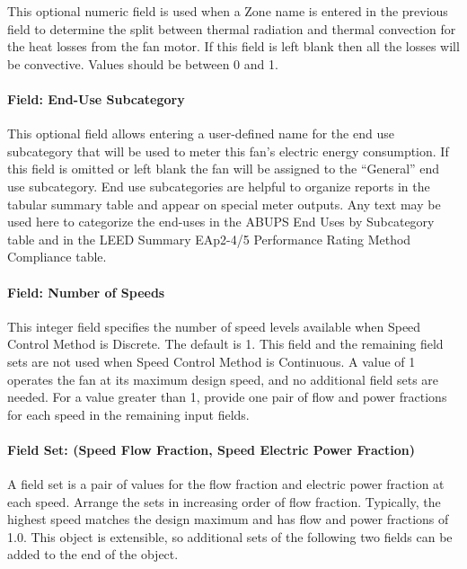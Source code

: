 This optional numeric field is used when a Zone name is entered in the previous field to determine the split between thermal radiation and thermal convection for the heat losses from the fan motor. If this field is left blank then all the losses will be convective.  Values should be between 0 and 1.

\paragraph{Field: End-Use Subcategory}\label{field-end-use-subcat-fansysmodel}

This optional field allows entering a user-defined name for the end use subcategory that will be used to meter this fan's electric energy consumption. If this field is omitted or left blank the fan will be assigned to the ``General'' end use subcategory.  End use subcategories are helpful to organize reports in the tabular summary table and appear on special meter outputs. Any text may be used here to categorize the end-uses in the ABUPS End Uses by Subcategory table and in the LEED Summary EAp2-4/5 Performance Rating Method Compliance table.

\paragraph{Field: Number of Speeds}\label{field-num-speeds-fansysmodel}

This integer field specifies the number of speed levels available when Speed Control Method is Discrete. The default is 1. This field and the remaining field sets are not used when Speed Control Method is Continuous. A value of 1 operates the fan at its maximum design speed, and no additional field sets are needed. For a value greater than 1, provide one pair of flow and power fractions for each speed in the remaining input fields.

\paragraph{Field Set: (Speed Flow Fraction, Speed Electric Power Fraction)}\label{fieldset-flow-power-fractions-fansysmodel}

A field set is a pair of values for the flow fraction and electric power fraction at each speed. Arrange the sets in increasing order of flow fraction. Typically, the highest speed matches the design maximum and has flow and power fractions of 1.0. This object is extensible, so additional sets of the following two fields can be added to the end of the object.

